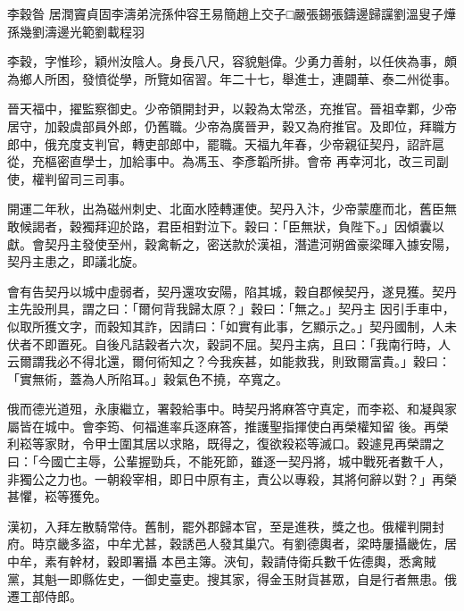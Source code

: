 
\begin{pinyinscope}

 李穀昝
 居潤竇貞固李濤弟浣孫仲容王易簡趙上交子□嚴張錫張鑄邊歸讜劉溫叟子燁孫幾劉濤邊光範劉載程羽



 李穀，字惟珍，穎州汝陰人。身長八尺，容貌魁偉。少勇力善射，以任俠為事，頗為鄉人所困，發憤從學，所覽如宿習。年二十七，舉進士，連闢華、泰二州從事。



 晉天福中，擢監察御史。少帝領開封尹，以穀為太常丞，充推官。晉祖幸鄴，少帝居守，加穀虞部員外郎，仍舊職。少帝為廣晉尹，穀又為府推官。及即位，拜職方郎中，俄充度支判官，轉吏部郎中，罷職。天福九年春，少帝親征契丹，詔許扈從，充樞密直學士，加給事中。為馮玉、李彥韜所排。會帝
 再幸河北，改三司副使，權判留司三司事。



 開運二年秋，出為磁州刺史、北面水陸轉運使。契丹入汴，少帝蒙塵而北，舊臣無敢候謁者，穀獨拜迎於路，君臣相對泣下。穀曰：「臣無狀，負陛下。」因傾囊以獻。會契丹主發使至州，穀禽斬之，密送款於漢祖，潛遣河朔酋豪梁暉入據安陽，契丹主患之，即議北旋。



 會有告契丹以城中虛弱者，契丹還攻安陽，陷其城，穀自郡候契丹，遂見獲。契丹主先設刑具，謂之曰：「爾何背我歸太原？」穀曰：「無之。」契丹主
 因引手車中，似取所獲文字，而穀知其詐，因請曰：「如實有此事，乞顯示之。」契丹國制，人未伏者不即置死。自後凡詰穀者六次，穀詞不屈。契丹主病，且曰：「我南行時，人云爾謂我必不得北還，爾何術知之？今我疾甚，如能救我，則致爾富貴。」穀曰：「實無術，蓋為人所陷耳。」穀氣色不撓，卒寬之。



 俄而德光道殂，永康繼立，署穀給事中。時契丹將麻答守真定，而李崧、和凝與家屬皆在城中。會李筠、何福進率兵逐麻答，推護聖指揮使白再榮權知留
 後。再榮利崧等家財，令甲士圍其居以求賂，既得之，復欲殺崧等滅口。穀遽見再榮謂之曰：「今國亡主辱，公輩握勁兵，不能死節，雖逐一契丹將，城中戰死者數千人，非獨公之力也。一朝殺宰相，即日中原有主，責公以專殺，其將何辭以對？」再榮甚懼，崧等獲免。



 漢初，入拜左散騎常侍。舊制，罷外郡歸本官，至是進秩，獎之也。俄權判開封府。時京畿多盜，中牟尤甚，穀誘邑人發其巢穴。有劉德輿者，梁時屢攝畿佐，居中牟，素有幹材，穀即署攝
 本邑主簿。浹旬，穀請侍衛兵數千佐德輿，悉禽賊黨，其魁一即縣佐史，一御史臺吏。搜其家，得金玉財貨甚眾，自是行者無患。俄遷工部侍郎。




\end{pinyinscope}
